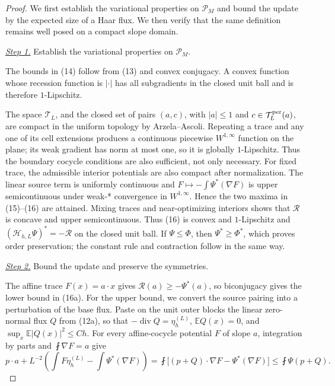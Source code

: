 \documentclass{aomart}
\theoremstyle{definition}
\newcommand{\1}{\mathbf 1}
\begin{document}
\begin{proof}
We first establish the variational properties on $\mathscr P_M$ and
bound the update by the expected size of a Haar flux.  We then verify
that the same definition remains well posed on a compact slope domain.

\smallskip\noindent
\underline{\textit{Step 1.}} Establish the variational properties on $\mathscr P_M$.

The bounds in (14) follow from (13) and convex conjugacy. A convex
function whose recession function is $|\cdot|$ has all subgradients in
the closed unit ball and is therefore $1$-Lipschitz.

The space $\mathcal T_ L$, and the closed set of pairs $(a,c)$, with
$|a|\leq1$ and $c\in\mathcal T_ L^{\rm per}(a)$, are compact in the
uniform topology by Arzela--Ascoli.  Repeating a trace and any one of its
cell extensions produces a continuous piecewise $W^{1,\infty}$ function
on the plane; its weak gradient has norm at most one, so it is globally
$1$-Lipschitz.  Thus the boundary cocycle conditions are also sufficient,
not only necessary.  For fixed trace, the admissible interior potentials are
also compact after normalization.  The linear source term is uniformly
continuous and $F\mapsto-\int\Psi^*(\nabla F)$ is upper
semicontinuous under weak-* convergence in $W^{1,\infty}$.  Hence the
two maxima in (15)--(16) are attained.  Mixing traces and
near-optimizing interiors shows that $\mathcal R$ is concave and upper
semicontinuous. Thus (16) is convex and $1$-Lipschitz and
$(\mathcal H_ {h,L}\Psi)^*=-\mathcal R$ on the closed unit ball.  If
$\Psi\leq\Phi$, then $\Psi^*\geq\Phi^*$, which proves order
preservation; the constant rule and contraction follow in the same way.

\smallskip\noindent
\underline{\textit{Step 2.}} Bound the update and preserve the symmetries.

The affine trace $F(x)=a\cdot x$ gives
$\mathcal R(a)\geq-\Psi^*(a)$, so biconjugacy gives the lower bound in
(16a).  For the upper bound, we convert the source pairing into a perturbation
of the base flux.  Paste on the unit outer blocks the linear zero-normal
flux $Q$ from (12a), so that
$-\operatorname {div}Q=\eta_ h^{(L)}$,
$\mathbb E Q(x)=0$, and
$\sup_ x\mathbb E|Q(x)|^2\leq Ch$.  For every affine-cocycle potential
$F$ of slope $a$, integration by parts and
$\fint\nabla F=a$ give
\begin{equation}
p\cdot a+L^{-2}\left(\int F\eta_ h^{(L)}-
\int\Psi^*(\nabla F)\right)
=\fint\bigl[(p+Q)\cdot\nabla F-\Psi^*(\nabla F)\bigr]
\leq\fint\Psi(p+Q).
\tag{16b}
\end{equation}


\end{proof}
\end{document}
